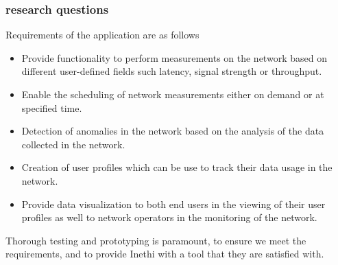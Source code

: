 \subsubsection{research questions}
Requirements of the application are as follows 
\begin{itemize}
	\item Provide functionality to perform measurements on the network based on different user-defined fields such latency, signal strength or throughput.
	
	\item Enable the scheduling of network measurements either on demand or at specified time.  
	
	\item Detection of anomalies in the network based on the analysis of the data collected in the network.
	
	\item Creation of user profiles which can be use to track their data usage in the network. 
	
	\item Provide data visualization to both end users in the viewing of their user profiles as well to network operators in the monitoring of the network.
\end{itemize}
Thorough testing and prototyping is paramount, to ensure we meet the requirements, and to provide Inethi with a tool that they are satisfied with.
